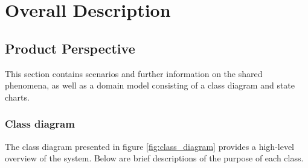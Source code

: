 \chapter{Overall Description}

\section{Product Perspective}

This section contains scenarios and further information on the shared phenomena, as well as a domain model consisting of a class diagram and state charts.

\subsection{Class diagram}

The class diagram presented in figure \ref{fig:class_diagram} provides a high-level overview of the system. Below are brief descriptions of the purpose of each class.

